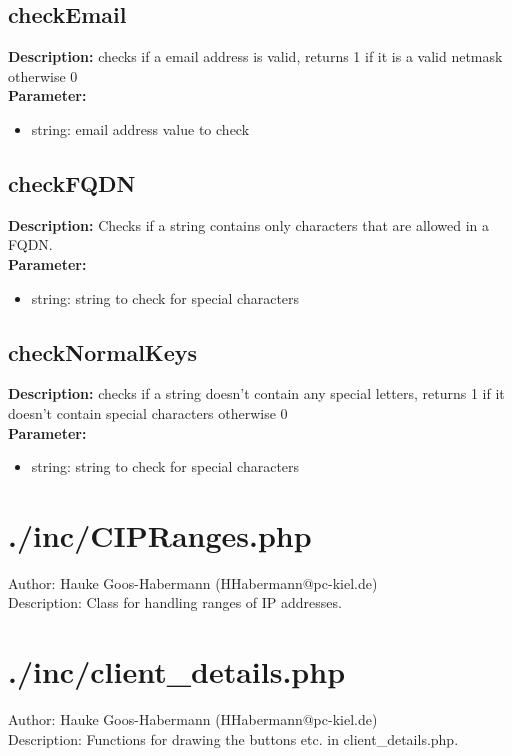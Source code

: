 \subsection{checkEmail}
\textbf{Description:} checks if a email address is valid, returns 1 if it is a valid netmask otherwise 0\\
\textbf{Parameter:}
\begin{itemize}
\item string: email address value to check
\end{itemize}

\subsection{checkFQDN}
\textbf{Description:} Checks if a string contains only characters that are allowed in a FQDN.\\
\textbf{Parameter:}
\begin{itemize}
\item string: string to check for special characters
\end{itemize}

\subsection{checkNormalKeys}
\textbf{Description:} checks if a string doesn't contain any special letters, returns 1 if it doesn't contain special characters otherwise 0\\
\textbf{Parameter:}
\begin{itemize}
\item string: string to check for special characters
\end{itemize}

\newpage\section{./inc/CIPRanges.php}
 Author: Hauke Goos-Habermann (HHabermann@pc-kiel.de)\\
 Description: Class for handling ranges of IP addresses.\\

\newpage\section{./inc/client_details.php}
 Author: Hauke Goos-Habermann (HHabermann@pc-kiel.de)\\
 Description: Functions for drawing the buttons etc. in client\_details.php.\\

